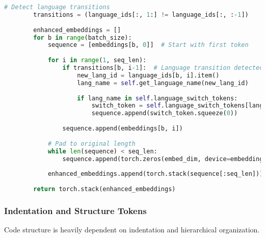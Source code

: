 \begin{lstlisting}[language=Python, caption=Language switching tokens for multi-language code generation]
        # Detect language transitions
        transitions = (language_ids[:, 1:] != language_ids[:, :-1])
        
        enhanced_embeddings = []
        for b in range(batch_size):
            sequence = [embeddings[b, 0]]  # Start with first token
            
            for i in range(1, seq_len):
                if transitions[b, i-1]:  # Language transition detected
                    new_lang_id = language_ids[b, i].item()
                    lang_name = self.get_language_name(new_lang_id)
                    
                    if lang_name in self.language_switch_tokens:
                        switch_token = self.language_switch_tokens[lang_name]
                        sequence.append(switch_token.squeeze(0))
                
                sequence.append(embeddings[b, i])
            
            # Pad to original length
            while len(sequence) < seq_len:
                sequence.append(torch.zeros(embed_dim, device=embeddings.device))
            
            enhanced_embeddings.append(torch.stack(sequence[:seq_len]))
        
        return torch.stack(enhanced_embeddings)
\end{lstlisting}

\subsubsection{Indentation and Structure Tokens}

Code structure is heavily dependent on indentation and hierarchical organization.

